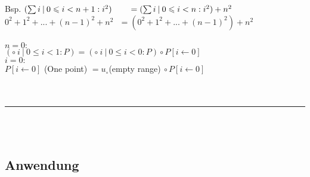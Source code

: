 \documentclass[18pt,a4paper]{article}
\newcommand{\tab}{\hspace*{2em}}
\begin{document}
Bsp. $(\sum{i} \:\vert\: 0\leqslant i < n+1 : i^2) \tab = (\sum{i} \:\vert\: 0\leqslant i < n : i^2) + n^2$\\
\tab $0^2 + 1^2 + ... + (n-1)^2 + n^2 \:\:\:= (0^2 + 1^2 + ... + (n-1)^2) + n^2$\\
\\
$n=0 :$\\
\tab $(\circ \:i \:\vert\: 0\leqslant i < 1 : P) = (\circ \:i \:\vert\: 0\leqslant i < 0 : P) \circ P[i\leftarrow 0]$\\
\tab $i=0 :$\\
\tab \tab $P[i\leftarrow 0]$ (One point) $= u_\circ $(empty range)$  \:\circ P[i\leftarrow 0]$\\
\\
\\
\rule{\textwidth}{0.4mm}\\
\\

\subsection{Anwendung}
\end{document}
